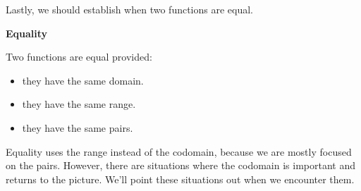 \documentclass{ximera}
\begin{document}
Lastly, we should establish when two functions are equal. \\





\begin{definition} \textbf{\textcolor{green!50!black}{Equality}}

Two functions are equal provided:

\begin{itemize}
\item they have the same domain.
\item they have the same range.
\item they have the same pairs.
\end{itemize}

\end{definition}
Equality uses the range instead of the codomain, because we are mostly focused on the pairs.  However, there are situations where the codomain is important and returns to the picture.  We'll point these situations out when we encounter them.
\end{document}
